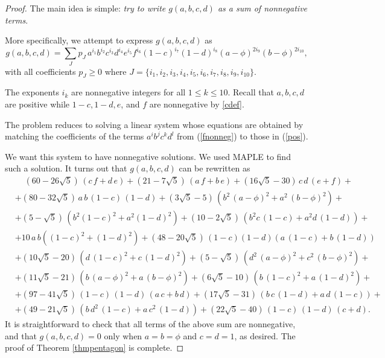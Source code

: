 \documentclass [10pt,oneside]{amsart}
\theoremstyle{definition}
\theoremstyle{plain}
\begin{document}
\begin{proof}
The main idea is simple: \emph{try to write $g(a,b,c,d)$ as a sum of nonnegative terms}.

More specifically, we attempt to express $g(a,b,c,d)$ as
\begin{equation}\label{pos}
g(a,b,c,d)=\sum_J p_J\,a^{i_1}b^{i_2}c^{i_3}d^{i_4}e^{i_5}f^{i_6}(1-c)^{i_7}(1-d)^{i_8}(a-\phi)^{2i_9}(b-\phi)^{2i_{10}},
\end{equation}
with all coefficients $p_J\ge 0$ where $J=\{i_1,i_2,i_3,i_4,i_5,i_6,i_7,i_8,i_9, i_{10}\}$.

The exponents $i_k$ are nonnegative integers for all $1\le k \le 10$.  Recall that $a, b, c, d$ are positive while $1-c, 1-d, e$, and $f$ are nonnegative by \eqref{cdef}.

The problem reduces to solving a linear system whose equations are obtained by matching the coefficients of the terms $a^ib^jc^kd^l$ from
(\ref{fnonneg}) to those in (\ref{pos}).

We want this system to have nonnegative solutions. We used MAPLE to find such a solution. It turns out
that $g(a,b,c,d)$ can be rewritten as
\begin{align*}
&\phantom{+i}(60 - 26\sqrt{5})\,(c\,f + d\,e) + (21 - 7\sqrt{5})\,(a\,f + b\,e) + (16\sqrt{5} - 30)\,c\,d\,(e + f) + \\
&+(80 - 32\sqrt{5})\,a\,b\,(1 - c)\,(1 - d) + (3\sqrt{5} - 5)\,(b^2\,(a - \phi)^2 + a^2\,(b - \phi)^2) + \\
&+(5 - \sqrt{5})\,(b^2(1 - c)^2 + a^2(1 - d)^2) + (10 - 2\sqrt{5})\,(b^2c\,(1 - c) + a^2d\,(1 - d)) +\\
&+ 10\,a\,b((1 - c)^2 +(1 - d)^2) +(48 - 20\sqrt{5})\,(1-c)(1-d)(a\,(1 - c)+b\,(1 - d)) \\
&+ (10\sqrt{5} - 20)\,(d\,(1 - c)^2 + c\,(1 - d)^2) + (5 - \sqrt{5})\,(d^2\,(a - \phi)^2 + c^2\,(b - \phi)^2) + \\
&+(11\sqrt{5} - 21)\,(b\,(a - \phi)^2 + a\,(b - \phi)^2) + (6\sqrt{5} - 10)\,(b\,(1 - c)^2 + a\,(1 - d)^2) +\\
&+(97 - 41\sqrt{5})\,(1 - c)\,(1 - d)\,(a\,c+b\,d) + (17\sqrt{5} - 31)\,(b\,c\,(1 - d) + a\,d\,(1 - c))+\\
&+(49 - 21\sqrt{5})\,(b\,d^2\,(1 - c) + a\,c^2\,(1 - d)) +(22\sqrt{5} - 40)\,(1 - c)\,(1 - d)\,(c+d).
\end{align*}
It is straightforward to check that all terms of the above sum are nonnegative, and that $g(a,b,c,d)=0$ only when $a=b=\phi$ and $c=d=1$, as desired.
The proof of Theorem \ref{thmpentagon} is complete.
\end{proof}
\end{document}
